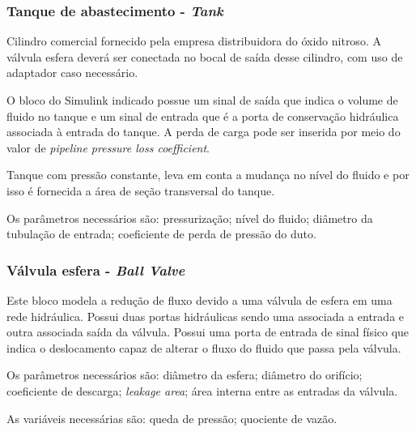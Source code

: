     \subsubsection{ Tanque de abastecimento - \textit{Tank}}
    \par Cilindro comercial fornecido pela empresa distribuidora do óxido nitroso. A válvula esfera deverá ser conectada no bocal de saída desse cilindro, com uso de adaptador caso necessário. 
    \par O bloco do Simulink indicado possue um sinal de saída que indica o volume de fluido no tanque e um sinal de entrada que é a porta de conservação hidráulica associada à entrada do tanque. A perda de carga pode ser inserida por meio do valor de \textit{pipeline pressure loss coefficient}. 
    \par Tanque com pressão constante, leva em conta a mudança no nível do fluido e por isso é fornecida a área de seção transversal do tanque. 
    \par Os parâmetros necessários são: pressurização; nível do fluido; diâmetro da tubulação de entrada; coeficiente de perda de pressão do duto.
    
    \subsubsection{ Válvula esfera - \textit{Ball Valve} }
    \par Este bloco modela a redução de fluxo devido a uma válvula de esfera em uma rede hidráulica. Possui duas portas hidráulicas sendo uma associada a entrada e outra associada saída da válvula. Possui uma porta de entrada de sinal físico que indica o deslocamento capaz de alterar o fluxo do fluido que passa pela válvula. 
    \par Os parâmetros necessários são: diâmetro da esfera; diâmetro do orifício; coeficiente de descarga; \textit{leakage area}; área interna entre as entradas da válvula.
    \par As variáveis necessárias são: queda de pressão; quociente de vazão.
    
